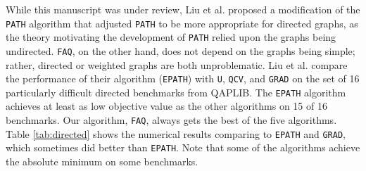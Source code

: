 \documentclass[11pt]{article}
\begin{document}
While this manuscript was under review, Liu et al. \cite{Liu2012} proposed a modification of the \texttt{PATH} algorithm that adjusted \texttt{PATH} to be more appropriate for directed graphs, as the theory motivating the development of \texttt{PATH} relied upon the graphs being undirected.  \texttt{FAQ}, on the other hand, does not depend on the graphs being simple; rather, directed or weighted graphs are both unproblematic. 
Liu et al. compare the performance of their algorithm (\texttt{EPATH}) with \texttt{U}, \texttt{QCV}, and \texttt{GRAD}
on the set of 16 particularly difficult directed benchmarks from QAPLIB.  The \texttt{EPATH} algorithm achieves at least as low objective value as the other algorithms on 15 of 16 benchmarks.  Our algorithm, \texttt{FAQ}, always gets the best of the five algorithms.  Table \ref{tab:directed} shows the numerical results comparing \FAQ to \texttt{EPATH} and \texttt{GRAD}, which sometimes did better than \texttt{EPATH}.  Note that some of the algorithms achieve the absolute minimum on some benchmarks.  
\end{document}
